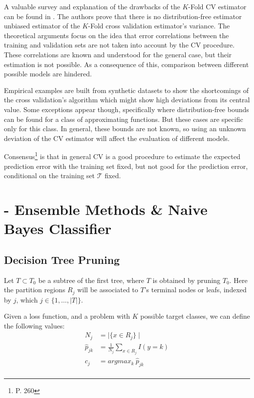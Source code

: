 \begin{appendices}
A valuable survey and explanation of the drawbacks of the $K$-Fold CV estimator can be found in \textcite{bengio-unbiasedCvEstimator}.
The authors prove that there is no distribution-free estimator unbiased estimator of the $K$-Fold cross validation estimator's variance.
The theoretical arguments focus on the idea that error correlations between the training and validation sets are not taken into account by the CV procedure.
These correlations are known and understood for the general case, but their estimation is not possible.
As a consequence of this, comparison between different possible models are hindered.

Empirical examples are built from synthetic datasets to show the shortcomings of the cross validation's algorithm which might show high deviations from its central value.
Some exceptions appear though, specifically where distribution-free bounds can be found for a class of approximating functions.
But these cases are specific only for this class.
In general, these bounds are not known, so using an unknown deviation of the CV estimator will affect the evaluation of different models.

Consensus\footnote{\textcite{hastie-elemstatslearn} P.
	260} is that in general CV is a good procedure to estimate the expected prediction error with the training set fixed, but not good for the prediction error, conditional on the training set $\mathcal{T}$ fixed.



\chapter{- Ensemble Methods \& Naive Bayes Classifier}\label{appx:ensembleBayes}

\section{Decision Tree Pruning}\label{appx:sec:tree_pruning}

Let $T \subset T_0$ be a subtree of the first tree, where $T$ is obtained by pruning $T_0$. Here the partition regions $R_j$ will be associated to $T$'s terminal nodes or leafs, indexed by $j$, which $j \in \{1,\ldots,|T| \}$.

Given a loss function, and a problem with $K$ possible target classes, we can define the following values:
\begin{equation}
\begin{split}
N_j & = \mid \{x \in R_j \}\mid \\
\hat{p}_{jk} & = \frac{1}{N_j} \sum_{x \in R_j} I(y=k)\\
c_j & = argmax_{k} \ \hat{p}_{jk} \\
\end{split}
\end{equation}\label{eq:decisionTreePruneParameters}


\end{appendices}
